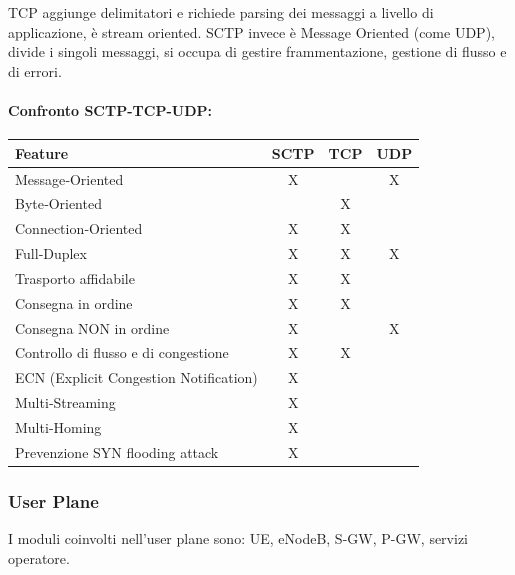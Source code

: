 TCP aggiunge delimitatori e richiede parsing dei messaggi a livello di applicazione, è stream oriented. SCTP invece è Message Oriented (come UDP), divide i singoli messaggi, si occupa di gestire frammentazione, gestione di flusso e di errori.\\

\paragraph{Confronto SCTP-TCP-UDP:}
\begin{center}
	\begin{tabular}{lccc}
		\toprule
		\textbf{Feature} & \textbf{SCTP} & \textbf{TCP} & \textbf{UDP} \\
		\midrule
		Message‐Oriented                              & X &   & X \\
		Byte‐Oriented                                 &   & X &   \\
		Connection‐Oriented                           & X & X &   \\
		Full‐Duplex                                   & X & X & X \\
		Trasporto affidabile                          & X & X &   \\
		Consegna in ordine                            & X & X &   \\
		Consegna NON in ordine               & X &   & X \\
		Controllo di flusso e di congestione          & X & X &   \\
		ECN (Explicit Congestion Notification)        & X &   &   \\
		Multi‐Streaming                               & X &   &   \\
		Multi‐Homing                                  & X &   &   \\
		Prevenzione SYN flooding attack               & X &   &   \\
		\bottomrule
	\end{tabular}
\end{center}

\newpage

\subsubsection{User Plane}

I moduli coinvolti nell'user plane sono: UE, eNodeB, S-GW, P-GW, servizi operatore.\\

